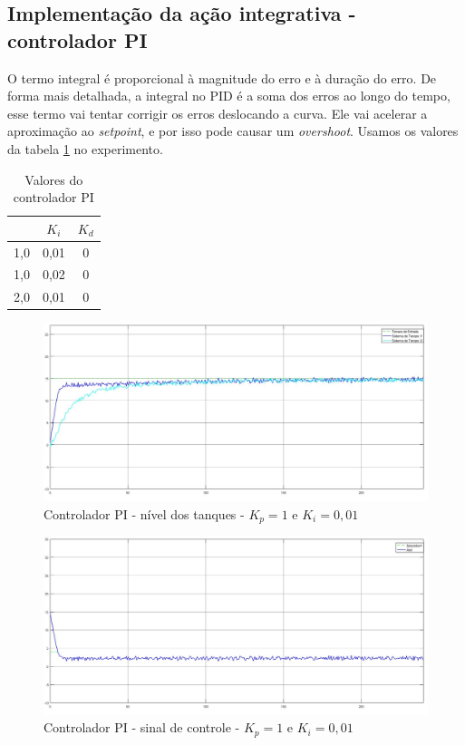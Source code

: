 \documentclass[
	12pt,				%
	openany,			%
	oneside,			%
	a4paper,			%
	english,			%
	french,				%
	spanish,			%
	brazil,				%
	]{abntex2}
\begin{document}
{\subsection{Implementação da ação integrativa - controlador PI}

O termo integral é proporcional à magnitude do erro e à duração do erro. De forma mais detalhada, a integral no PID é a soma dos erros ao longo do tempo, esse termo vai tentar corrigir os erros deslocando a curva. Ele vai acelerar a aproximação ao \textit{setpoint}, e por isso pode causar um \textit{overshoot}. Usamos os valores da tabela \ref{tab:tabelaPI} no experimento.

\begin{table}[h]
\centering
\begin{tabular}{ccc}
\multicolumn{0}{c}{} $K_p$ & $K_i$ & $K_d$ \\\hline
                    1,0 & 0,01 & 0 \\
                    1,0 & 0,02 & 0 \\
                    2,0 & 0,01 & 0
\end{tabular}
\caption{Valores do controlador PI}
\label{tab:tabelaPI}
\end{table}

\begin{figure}[h]
	\centering
	\includegraphics[scale=0.30]{1 - nivel_PI_1kp_001ki.jpg}
	\caption{Controlador PI - nível dos tanques - $K_p = 1$ e $K_i = 0,01$}
	\label{fig:controladorPI_1}
\end{figure}

\begin{figure}[h]
	\centering
	\includegraphics[scale=0.30]{1 - PI sinal_controle.jpg}
	\caption{Controlador PI - sinal de controle - $K_p = 1$ e $K_i = 0,01$}
	\label{fig:sinal_controladorPI_1}
\end{figure}

}
\end{document}
